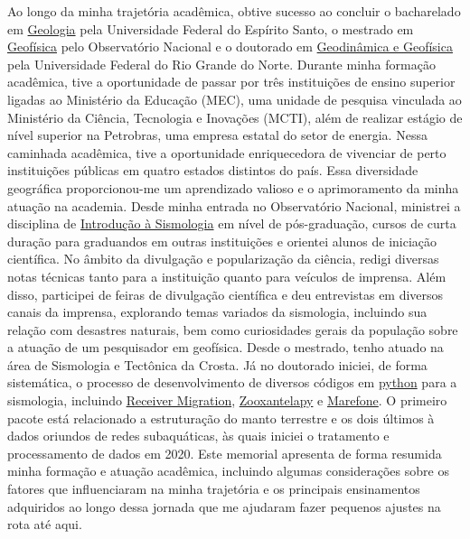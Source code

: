 \documentclass[10pt,a4paper,oneside]{book}
\begin{document}
Ao longo da minha trajetória acadêmica, obtive sucesso ao concluir o bacharelado em \href{https://geologia.ufes.br/}{Geologia} pela Universidade Federal do Espírito Santo, o mestrado em \href{https://www.gov.br/observatorio/pt-br/assuntos/programas-academicos/pos-graduacao-em-geofisica/pos-graduacao-em-geofisica}{Geofísica} pelo Observatório Nacional e o doutorado em \href{https://posgraduacao.ufrn.br/325}{Geodinâmica e Geofísica} pela Universidade Federal do Rio Grande do Norte. Durante minha formação acadêmica, tive a oportunidade de passar por três instituições de ensino superior ligadas ao Ministério da Educação (MEC), uma unidade de pesquisa vinculada ao Ministério da Ciência, Tecnologia e Inovações (MCTI), além de realizar estágio de nível superior na Petrobras, uma empresa estatal do setor de energia. Nessa caminhada acadêmica, tive a oportunidade enriquecedora de vivenciar de perto instituições públicas em quatro estados distintos do país. Essa diversidade geográfica proporcionou-me um aprendizado valioso e o aprimoramento da minha atuação na academia. Desde minha entrada no Observatório Nacional, ministrei a disciplina de \href{https://www.gov.br/observatorio/pt-br/assuntos/programas-academicos/pos-graduacao-em-geofisica/grade-curricular}{Introdução à Sismologia} em nível de pós-graduação, cursos de curta duração para graduandos em outras instituições e orientei alunos de iniciação científica. No âmbito da divulgação e popularização da ciência, redigi diversas notas técnicas tanto para a instituição quanto para veículos de imprensa. Além disso, participei de feiras de divulgação científica e deu entrevistas em diversos canais da imprensa, explorando temas variados da sismologia, incluindo sua relação com desastres naturais, bem como curiosidades gerais da população sobre a atuação de um pesquisador em geofísica. Desde o mestrado, tenho atuado na área de Sismologia e Tectônica da Crosta. Já no doutorado iniciei, de forma sistemática, o processo de desenvolvimento de diversos códigos em \href{https://www.python.org/}{python} para a sismologia, incluindo \href{https://github.com/dIOGOLOC/codes_escritos/tree/master/mantle_transition_zone_migration_obspy_Pds}{Receiver Migration}, \href{https://zooxantelapy.readthedocs.io/en/latest/}{Zooxantelapy} e \href{https://github.com/dIOGOLOC/marefone/wiki}{Marefone}. O primeiro pacote está relacionado a estruturação do manto terrestre e os dois últimos à dados oriundos de redes subaquáticas, às quais iniciei o tratamento e processamento de dados em 2020. Este memorial apresenta de forma resumida minha formação e atuação acadêmica, incluindo algumas considerações sobre os fatores que influenciaram na minha trajetória e os principais ensinamentos adquiridos ao longo dessa jornada que me ajudaram fazer pequenos ajustes na rota até aqui.
\end{document}
